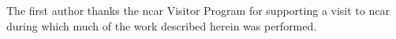 




%





%
\begin{acks}
The first author thanks the
\gls{ncar} Visitor Program for supporting a visit to \gls{ncar} during which
much of the work described herein was performed.


\end{acks}
